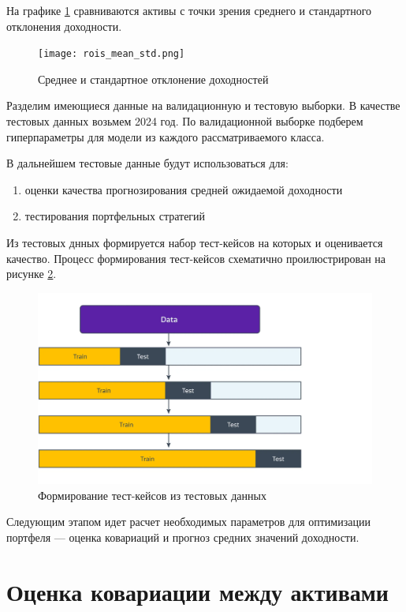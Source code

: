 На графике \ref{fig:rois_mean_std} сравниваются активы с точки зрения 
среднего и стандартного отклонения доходности.

\begin{figure}[H]
	\centering
	\texttt{[image: rois\_mean\_std.png]}
	\caption{Среднее и стандартное отклонение доходностей}
	\label{fig:rois_mean_std}
\end{figure}

Разделим имеющиеся данные на валидационную и тестовую выборки. В качестве тестовых данных возьмем 2024 год.
По валидационной выборке подберем гиперпараметры для модели из каждого рассматриваемого класса.

В дальнейшем тестовые данные будут использоваться для:
\begin{enumerate}
	\item оценки качества прогнозирования средней ожидаемой доходности
	\item тестирования портфельных стратегий
\end{enumerate}

Из тестовых днных формируется набор тест-кейсов на которых и оценивается качество.
Процесс формирования тест-кейсов схематично проилюстрирован на рисунке \ref{fig:ts_csv}.
\begin{figure}[H]
	\centering
	\includegraphics[width=\textwidth]{images/ts_cv}
	\caption{Формирование тест-кейсов из тестовых данных}
	\label{fig:ts_csv}
\end{figure}

Следующим этапом идет расчет необходимых параметров для оптимизации портфеля --- 
оценка ковариаций и прогноз средних значений доходности.

\section{Оценка ковариации между активами}

